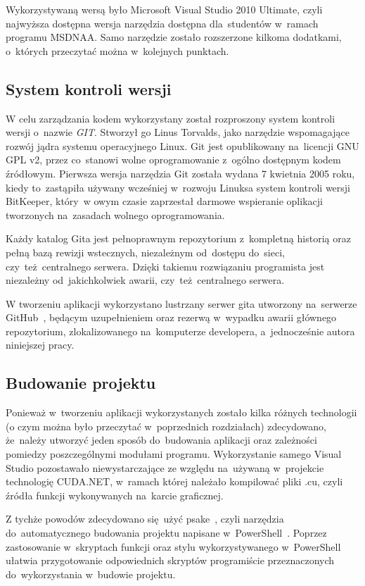 Wykorzystywaną wersą było Microsoft Visual Studio 2010 Ultimate, czyli najwyższa dostępna wersja narzędzia dostępna dla~studentów w~ramach programu MSDNAA. Samo narzędzie zostało rozszerzone kilkoma dodatkami, o~których przeczytać można w~kolejnych punktach.

\subsection{System kontroli wersji}
W celu zarządzania kodem wykorzystany został rozproszony system kontroli wersji o~nazwie \emph{GIT}. Stworzył go Linus Torvalds, jako narzędzie wspomagające rozwój jądra systemu operacyjnego Linux. Git jest opublikowany na~licencji GNU GPL v2, przez co~stanowi wolne oprogramowanie z~ogólno dostępnym kodem źródłowym. Pierwsza wersja narzędzia Git została wydana 7 kwietnia 2005 roku, kiedy to~zastąpiła używany wcześniej w~rozwoju Linuksa system kontroli wersji BitKeeper, który~w owym czasie zaprzestał darmowe wspieranie oplikacji tworzonych na~zasadach wolnego oprogramowania.

Każdy katalog Gita jest pełnoprawnym repozytorium z~kompletną historią oraz pełną bazą rewizji wstecznych, niezależnym od~dostępu do~sieci, czy~też~centralnego serwera. Dzięki takiemu rozwiązaniu programista jest niezależny od~jakichkolwiek awarii, czy~też~centralnego serwera. 

W tworzeniu aplikacji wykorzystano lustrzany serwer gita utworzony na~serwerze GitHub~\cite{cs:github}, będącym uzupełnieniem oraz rezerwą w~wypadku awarii głównego repozytorium, zlokalizowanego na~komputerze developera, a~jednocześnie autora niniejszej pracy.

\subsection{Budowanie projektu}
Ponieważ w~tworzeniu aplikacji wykorzystanych zostało kilka różnych technologii (o czym można było przeczytać w~poprzednich rozdziałach) zdecydowano, że~należy utworzyć jeden sposób do~budowania aplikacji oraz zależności pomiedzy poszczególnymi modułami programu. Wykorzystanie samego Visual Studio pozostawało niewystarczające ze względu na~używaną w~projekcie technologię CUDA.NET, w~ramach której należało kompilować pliki .cu, czyli źródła funkcji wykonywanych na~karcie graficznej.

Z tychże powodów zdecydowano się~użyć psake~\cite{cs:psake}, czyli narzędzia do~automatycznego budowania projektu napisane w~PowerShell~\cite{ms:powershell}. Poprzez zastosowanie w~skryptach funkcji oraz stylu wykorzystywanego w~PowerShell ułatwia przygotowanie odpowiednich skryptów programiście przeznaczonych do~wykorzystania w~budowie projektu.

